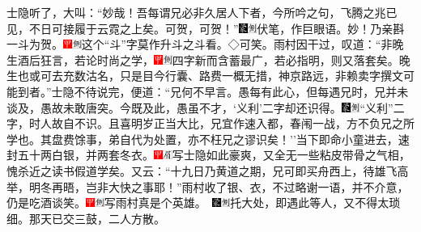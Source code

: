 士隐听了，大叫：``妙哉！吾每谓兄必非久居人下者，今所吟之句，飞腾之兆已见，不日可接履于云霓之上矣。可贺，可贺！''{\includegraphics[width=3mm]{../Images/00006}\includegraphics[width=3mm]{../Images/00011}\footnotesize 伏笔，作巨眼语。妙！}乃亲斟一斗为贺。{\includegraphics[width=3mm]{../Images/00002}\includegraphics[width=3mm]{../Images/00011}\footnotesize 这个``斗''字莫作升斗之斗看。◇可笑。}雨村因干过，叹道：``非晚生酒后狂言，若论时尚之学，{\includegraphics[width=3mm]{../Images/00002}\includegraphics[width=3mm]{../Images/00011}\footnotesize 四字新而含蓄最广，若必指明，则又落套矣。}晚生也或可去充数沽名，只是目今行囊、路费一概无措，神京路远，非赖卖字撰文可能到者。''士隐不待说完，便道：``兄何不早言。愚每有此心，但每遇兄时，兄并未谈及，愚故未敢唐突。今既及此，愚虽不才，`义利'二字却还识得。{\includegraphics[width=3mm]{../Images/00006}\includegraphics[width=3mm]{../Images/00011}\footnotesize ``义利''二字，时人故自不识。}且喜明岁正当大比，兄宜作速入都，春闱一战，方不负兄之所学也。其盘费馀事，弟自代为处置，亦不枉兄之谬识矣！''当下即命小童进去，速封五十两白银，并两套冬衣。{\includegraphics[width=3mm]{../Images/00002}\includegraphics[width=3mm]{../Images/00010}\footnotesize  写士隐如此豪爽，又全无一些粘皮带骨之气相，愧杀近之读书假道学矣。}又云：``十九日乃黄道之期，兄可即买舟西上，待雄飞高举，明冬再晤，岂非大快之事耶！''雨村收了银、衣，不过略谢一语，并不介意，仍是吃酒谈笑。{{\includegraphics[width=3mm]{../Images/00002}\includegraphics[width=3mm]{../Images/00011}\footnotesize 写雨村真是个英雄。　}\includegraphics[width=3mm]{../Images/00006}\includegraphics[width=3mm]{../Images/00011}\footnotesize 托大处，即遇此等人，又不得太琐细。}那天已交三鼓，二人方散。


